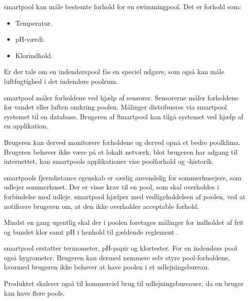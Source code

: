 \gls{smartpool} kan måle bestemte forhold for en swimmingpool. 
Det er forhold som:

\begin{itemize}
	\item Temperatur.
	\item pH-værdi.
	\item Klorindhold.
\end{itemize}

Er der tale om en indendørspool fås en speciel udgave, som også kan måle luftfugtighed i det indendørs poolrum.

\gls{smartpool} måler forholdene ved hjælp af sensorer. Sensorerne måler forholdene for vandet eller luften omkring poolen. Målinger distribueres via \gls{smartpool} systemet til en database. Brugeren af Smartpool kan tilgå systemet ved hjælp af en applikation. 

Brugeren kan derved monitorere forholdene og derved opnå et bedre poolklima. Brugeren behøver ikke være på et lokalt netværk, blot brugeren har adgang til internettet, kan \glspl{smartpool} applikationer vise poolforhold og -historik. 

\glspl{smartpool} fjerndistance egenskab er særlig anvendelig for sommerhusejere, som udlejer sommerhuset. Der er visse krav til en pool, som skal overholdes i forbindelse med udleje\cite{feriehusudlejernesbrancheforening2012}. \gls{smartpool} hjælper med vedligeholdelsen af poolen, ved at notificere brugeren om, at den ikke overholder acceptable forhold. 

Mindst en gang ugentlig skal der i poolen foretages målinger for indholdet af frit og bundet klor samt pH i henhold til gældende reglement \cite{feriehusudlejernesbrancheforening2012}.

\gls{smartpool} erstatter termometer, pH-papir og klortester. For en indendørs pool også hygrometer. Brugeren kan dermed nemmere selv styre pool-forholdene, hvormed brugeren ikke behøver at have poolen i et udlejningsbureau.

Produktet skalerer også til kommerciel brug til udlejningsbureauer, da en bruger kan have flere pools. 
